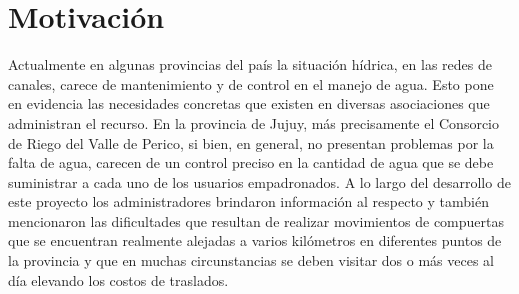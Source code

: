 %
%
%
%
%
%

%

\section{Motivación}
Actualmente en algunas provincias del país la situación hídrica, en las redes de canales, carece de mantenimiento y de control en el manejo de agua.
Esto pone en evidencia las necesidades concretas que existen en diversas asociaciones que administran el recurso.
En la provincia de Jujuy, más precisamente el Consorcio de Riego del Valle de Perico, si bien, en general, no presentan problemas por la falta de agua, carecen de un control preciso en la cantidad de agua que se debe suministrar a cada uno de los usuarios empadronados. 
A lo largo del desarrollo de este proyecto los administradores brindaron información al respecto y también mencionaron las dificultades que resultan de realizar movimientos de compuertas que se encuentran realmente alejadas a varios kilómetros en diferentes puntos de la provincia y que en muchas circunstancias se deben visitar dos o más veces al día elevando los costos de traslados. 

